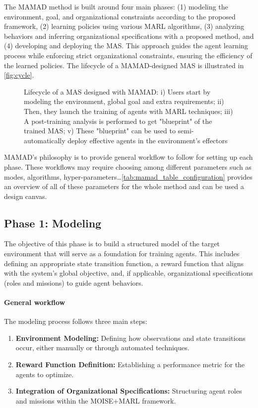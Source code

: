 \documentclass[pdflatex,sn-mathphys-num]{sn-jnl}%
\theoremstyle{thmstyleone}%
\theoremstyle{thmstyletwo}%
\theoremstyle{thmstylethree}%
\begin{document}
The MAMAD method is built around four main phases: (1) modeling the environment, goal, and organizational constraints according to the proposed framework, (2) learning policies using various MARL algorithms, (3) analyzing behaviors and inferring organizational specifications with a proposed method, and (4) developing and deploying the MAS. This approach guides the agent learning process while enforcing strict organizational constraints, ensuring the efficiency of the learned policies. The lifecycle of a MAMAD-designed MAS is illustrated in \autoref{fig:cycle}.



\begin{figure}[h!]
  \centering
  
  \caption{Lifecycle of a MAS designed with MAMAD: i) Users start by modeling the environment, global goal and extra requirements; \quad ii) Then, they launch the training of agents with MARL techniques; \quad iii) A post-training analysis is performed to get "blueprint" of the trained MAS; \quad v) These "blueprint" can be used to semi-automatically deploy effective agents in the environment's effectors}
  \label{fig:cycle}
\end{figure}

MAMAD's philosophy is to provide general workflow to follow for setting up each phase. These workflows may require choosing among different parameters such as modes, algorithms, hyper-parameters\dots \autoref{tab:mamad_table_configuration} provides an overview of all of these parameters for the whole method and can be used a design canvas.



\subsection{Phase 1: Modeling}

The objective of this phase is to build a structured model of the target environment that will serve as a foundation for training agents. This includes defining an appropriate state transition function, a reward function that aligns with the system's global objective, and, if applicable, organizational specifications (roles and missions) to guide agent behaviors.

\paragraph{\textbf{General workflow}}
The modeling process follows three main steps:
\begin{enumerate}
    \item \textbf{Environment Modeling:} Defining how observations and state transitions occur, either manually or through automated techniques.
    \item \textbf{Reward Function Definition:} Establishing a performance metric for the agents to optimize.
    \item \textbf{Integration of Organizational Specifications:} Structuring agent roles and missions within the MOISE+MARL framework.
\end{enumerate}
\end{document}
